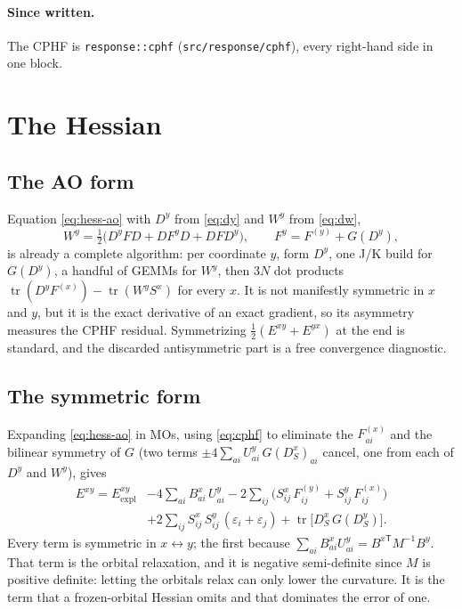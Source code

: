 \documentclass[11pt]{article}
\newcommand{\code}[1]{\texttt{#1}}
\newcommand{\eps}{\varepsilon}
\newcommand{\tr}{\operatorname{tr}}
\newcommand{\Fsk}[1]{F^{(#1)}}
\newcommand{\Exy}{E^{xy}}
\newcommand{\Dsk}[1]{D_S^{#1}}
\begin{document}
\paragraph{Since written.} The CPHF is \code{response::cphf}
(\code{src/response/cphf}), every right-hand side in one block.

\section{The Hessian}
\label{sec:hessian}

\subsection{The AO form}

Equation \eqref{eq:hess-ao} with $D^y$ from \eqref{eq:dy} and $W^y$ from
\eqref{eq:dw},
\begin{equation}
  W^y = \tfrac12\bigl(D^y F D + D F^y D + D F D^y\bigr),
  \qquad F^y = \Fsk{y} + G(D^y),
  \label{eq:wy}
\end{equation}
is already a complete algorithm: per coordinate $y$, form $D^y$, one J/K
build for $G(D^y)$, a handful of GEMMs for $W^y$, then $3N$ dot products
$\tr(D^y \Fsk{x}) - \tr(W^y S^x)$ for every $x$. It is not manifestly
symmetric in $x$ and $y$, but it is the exact derivative of an exact
gradient, so its asymmetry measures the CPHF residual. Symmetrizing
$\frac12(\Exy + E^{yx})$ at the end is standard, and the discarded
antisymmetric part is a free convergence diagnostic.

\subsection{The symmetric form}

Expanding \eqref{eq:hess-ao} in MOs, using \eqref{eq:cphf} to eliminate the
$\Fsk{x}_{ai}$ and the bilinear symmetry of $G$ (two terms
$\pm 4\sum_{ai} U^y_{ai}\,G(\Dsk{x})_{ai}$ cancel, one from each of $D^y$
and $W^y$), gives
\begin{equation}
  \boxed{\;
  \begin{aligned}
  \Exy = \Exy_{\mathrm{expl}}
  &- 4\sum_{ai} B^x_{ai}\,U^y_{ai}
   - 2\sum_{ij}\bigl(S^x_{ij}\,\Fsk{y}_{ij} + S^y_{ij}\,\Fsk{x}_{ij}\bigr)\\
  &+ 2\sum_{ij} S^x_{ij}\,S^y_{ij}\,(\eps_i + \eps_j)
   + \tr\bigl[\Dsk{x}\,G(\Dsk{y})\bigr].
  \end{aligned}\;}
  \label{eq:hess-sym}
\end{equation}
Every term is symmetric in $x\leftrightarrow y$; the first because
$\sum_{ai} B^x_{ai} U^y_{ai} = B^{x\mathsf T} M^{-1} B^y$. That term is the
orbital relaxation, and it is negative semi-definite since $M$ is positive
definite: letting the orbitals relax can only lower the curvature. It is
the term that a frozen-orbital Hessian omits and that dominates the error
of one.
\end{document}

